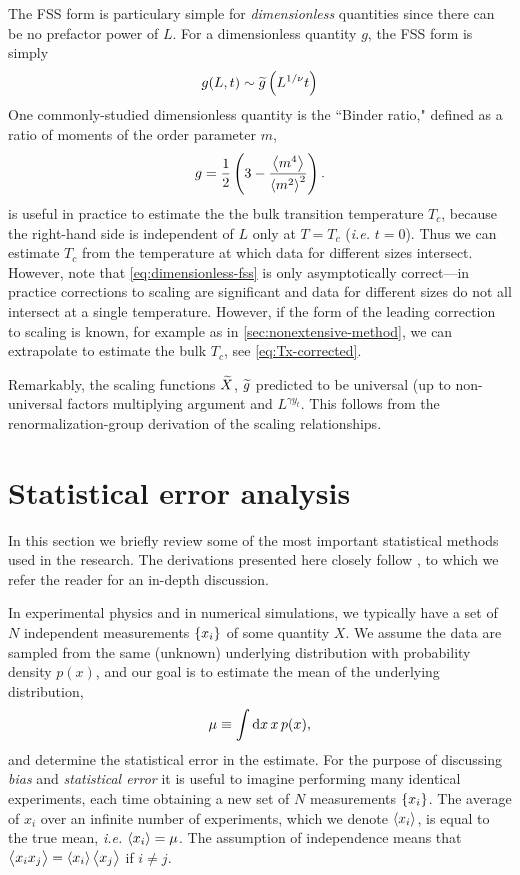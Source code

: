 The FSS form is particulary simple for \emph{dimensionless} quantities since
there can be no prefactor power of $L$. For a dimensionless quantity $g$, the
FSS form is simply
\begin{equation}
  g(L,t) \sim \widetilde{g}\left(L^{1/\nu} t\right)
  \label{eq:dimensionless-fss}
\end{equation}
One commonly-studied dimensionless quantity is the ``Binder ratio,"
defined as a ratio of moments of the order parameter $m$,
\begin{equation}
  g = \frac{1}{2}\left(3 - \frac{\left< m^4 \right>}{\left< m^2 \right>^2}\right).
  \label{eq:def-binder}
\end{equation}
 is useful in practice to estimate the the bulk
transition temperature $T_c$, because the right-hand side is independent of $L$
only at $T=T_c$ (\emph{i.e.} $t=0$). Thus we can estimate $T_c$ from the
temperature at which data for different sizes intersect. However, note that
\cref{eq:dimensionless-fss} is only asymptotically correct---in practice
corrections to scaling are significant and data for different sizes do not all
intersect at a single temperature. However, if the form of the leading
correction to scaling is known, for example as in
\cref{sec:nonextensive-method}, we can extrapolate to estimate the bulk $T_c$,
see \cref{eq:Tx-corrected}.

Remarkably, the scaling functions $\widetilde{X}$, $\widetilde{g}$ predicted to
be universal (up to non-universal factors multiplying argument and $L^{\gamma
  y_t}$. This follows from the renormalization-group derivation of the scaling
relationships.


\section{Statistical error analysis}

\newcommand{\sav}[1]{\overline{#1}}

In this section we briefly review some of the most important statistical
methods used in the research. The derivations presented here closely follow
\textcite{young2015everything}, to which we refer the reader for an in-depth
discussion.

In experimental physics and in numerical simulations, we typically have a set
of $N$ independent measurements $\cbr{x_i}$ of some quantity $X$. We assume the
data are sampled from the same (unknown) underlying distribution with
probability density $p(x)$, and our goal is to estimate the mean of the
underlying distribution,
\begin{equation}
  \mu \equiv \int \mathop{}\!\mathrm{d} x \, x \, p(x),
\end{equation}
and determine the statistical error in the estimate. For the purpose of
discussing \emph{bias} and \emph{statistical error} it is useful to imagine
performing many identical experiments, each time obtaining a new set of $N$
measurements $\cbr{x_i}$. The average of $x_i$ over an infinite number of
experiments, which we denote $\left< x_i \right>$, is equal to the true mean,
\textit{i.e.} $\left< x_i \right>=\mu$. The assumption of independence means that
$\left< x_i x_j \right>=\left< x_i \right>\left< x_j \right>$ if $i \neq j$.


